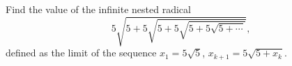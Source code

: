 Find the value of the infinite nested radical
\[5\sqrt{5+5\sqrt{5+5\sqrt{5+5\sqrt{5+\cdots}}}},\]
defined as the limit of the sequence $x_1=5\sqrt5$, $x_{k+1}=5\sqrt{5+x_k}$.

